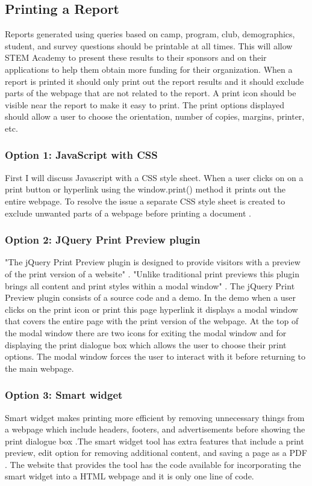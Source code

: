 \documentclass[letterpaper,10pt,serif, draftclsnofoot,onecolumn, compsoc, titlepage]{IEEEtran}
\begin{document}
\subsection{Printing a Report}
Reports generated using queries based on camp, program, club, demographics, student, and survey questions should be printable at all times. This will allow STEM Academy to present these results to their sponsors and on their applications to help them obtain more funding for their organization. When a report is printed it should only print out the report results and it should exclude parts of the webpage that are not related to the report. A print icon should be visible near the report to make it easy to print. The print options displayed should allow a user to choose the orientation, number of copies, margins, printer, etc. 

\subsubsection{Option 1: JavaScript with CSS}
First I will discuss Javascript with a CSS style sheet. When a user clicks on on a print button or hyperlink using the window.print() method it prints out the entire webpage\cite{Javascript}. To resolve the issue a separate CSS style sheet is created to exclude unwanted parts of a webpage before printing a document \cite{Javascript}. 

\subsubsection{Option 2: JQuery Print Preview plugin}
"The jQuery Print Preview plugin is designed to provide visitors with a preview of the print version of a website" \cite{Sam}. "Unlike traditional print previews this plugin brings all content and print styles within a modal window" \cite{Sam}. The jQuery Print Preview plugin consists of a source code and a demo. In the demo when a user clicks on the print icon or print this page hyperlink it displays a modal window that covers the entire page with the print version of the webpage. At the top of the modal window there are two icons for exiting the modal window and for displaying the print dialogue box which allows the user to choose their print options. The modal window forces the user to interact with it before returning to the main webpage.

\subsubsection{Option 3: Smart widget}
Smart widget makes printing more efficient by removing unnecessary things from a webpage which include headers, footers, and advertisements before showing the print dialogue box \cite{SmartW}.The smart widget tool has extra features that include a print preview, edit option for removing additional content, and saving a page as a PDF \cite{SmartW}. The website that provides the tool has the code available for incorporating the smart widget into a HTML webpage and it is only one line of code. 
\end{document}
